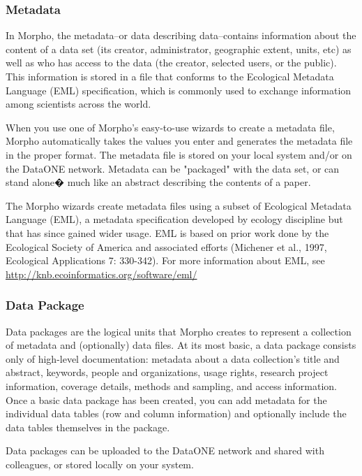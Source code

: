 \subsubsection{Metadata} \label{sec:metadata}

In Morpho, the metadata--or data describing data--contains information
about the content of a data set (its creator, administrator, geographic
extent, units, etc) as well as who has access to the data (the creator,
selected users, or the public). This information is stored in a file
that conforms to the Ecological Metadata Language (EML) specification,
which is commonly used to exchange information among scientists across
the world.

When you use one of Morpho's easy-to-use wizards to create a metadata
file, Morpho automatically takes the values you enter and generates the
metadata file in the proper format. The metadata file is stored on your
local system and/or on the DataONE network. Metadata can be "packaged" with
the data set, or can stand alone� much like an abstract describing the
contents of a paper. 

The Morpho wizards create metadata files using a subset of Ecological
Metadata Language (EML), a metadata specification developed by ecology
discipline but that has since gained wider usage. EML is based on prior
work done by the Ecological Society of America and associated efforts
(Michener et al., 1997, Ecological Applications 7: 330-342). For more
information about EML, see
\url{http://knb.ecoinformatics.org/software/eml/}


\subsubsection{Data Package} \label{sec:data package}

Data packages are the logical units that Morpho creates to represent a
collection of metadata and (optionally) data files. At its most basic, a
data package consists only of high-level documentation: metadata about a
data collection's title and abstract, keywords, people and
organizations, usage rights, research project information, coverage
details, methods and sampling, and access information. Once a basic data
package has been created, you can add metadata for the individual data
tables (row and column information) and optionally include the data
tables themselves in the package. 

Data packages can be uploaded to the DataONE network and shared with
colleagues, or stored locally on your system.

